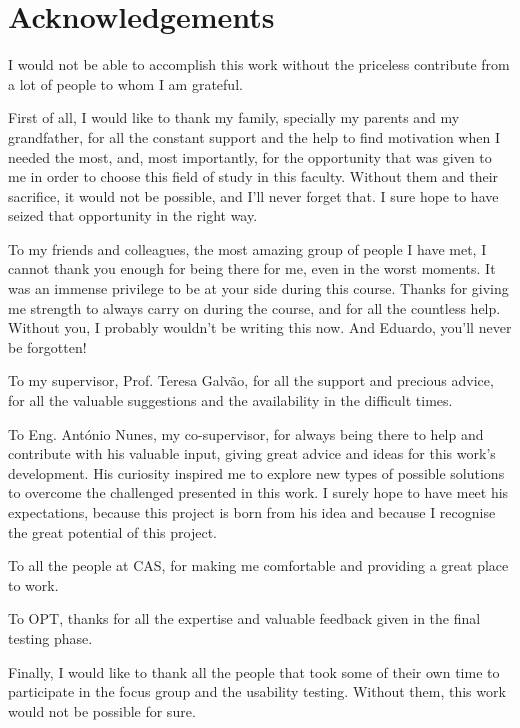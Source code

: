 \chapter*{Acknowledgements}

I would not be able to accomplish this work without the priceless contribute from a lot of people to whom I am grateful.

First of all, I would like to thank my family, specially my parents and my grandfather, for all the constant support and the help to find motivation when I needed the most, and, most importantly, for the opportunity that was given to me in order to choose this field of study in this faculty. Without them and their sacrifice, it would not be possible, and I'll never forget that. I sure hope to have seized that opportunity in the right way.

To my friends and colleagues, the most amazing group of people I have met, I cannot thank you enough for being there for me, even in the worst moments. It was an immense privilege to be at your side during this course. Thanks for giving me strength to always carry on during the course, and for all the countless help. Without you, I probably wouldn't be writing this now. And Eduardo, you'll never be forgotten!

To my supervisor, Prof. Teresa Galvão, for all the support and precious advice, for all the valuable suggestions and the availability in the difficult times.

To Eng. António Nunes, my co-supervisor, for always being there to help and contribute with his valuable input, giving great advice and ideas for this work's development. His curiosity inspired me to explore new types of possible solutions to overcome the challenged presented in this work. I surely hope to have meet his expectations, because this project is born from his idea and because I recognise the great potential of this project.

To all the people at CAS, for making me comfortable and providing a great place to work.

To OPT, thanks for all the expertise and valuable feedback given in the final testing phase.

Finally, I would like to thank all the people that took some of their own time to participate in the focus group and the usability testing. Without them, this work would not be possible for sure.



\vspace{10mm}
